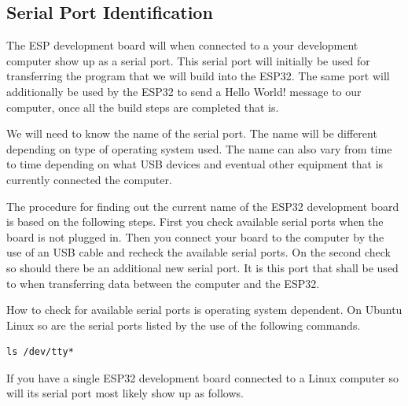 \documentclass{tufte-book}
\begin{document}
\subsection{Serial Port Identification} \label{sec:serial}


The ESP development board will when connected to a your development computer show up as a serial port. This serial port will initially be used for transferring the program that we will build into the ESP32. The same port will additionally be used by the ESP32 to send a Hello World! message to our computer, once all the build steps are completed that is.

We will need to know the name of the serial port. The name will be different depending on type of operating system used. The name can also vary from time to time depending on what USB devices and eventual other equipment that is currently connected the computer.

The procedure for finding out the current name of the ESP32 development board is based on the following steps. First you check available serial ports when the board is not plugged in. Then you connect your board to the computer by the use of an USB cable and recheck the available serial ports. On the second check so should there be an additional new serial port. It is this port that shall be used to when transferring data between the computer and the ESP32.

How to check for available serial ports is operating system dependent. On Ubuntu Linux so are the serial ports listed by the use of the following commands.

\begin{lstlisting}
ls /dev/tty*
\end{lstlisting}

If you have a single ESP32 development board connected to a Linux computer so will its serial port most likely show up as follows.
\end{document}
